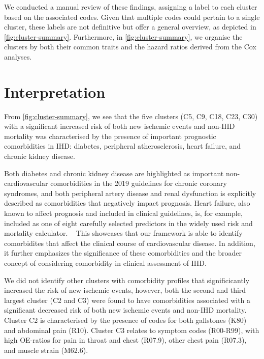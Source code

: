 We conducted a manual review of these findings, assigning a label to each
cluster based on the associated codes. Given that multiple codes could pertain
to a single cluster, these labels are not definitive but offer a general
overview, as depicted in \cref{fig:cluster-summary}. 
Furthermore, in \cref{fig:cluster-summary}, we organise the
clusters by both their common traits and the hazard ratios 
derived from the Cox analyses.

\section{Interpretation}

From \cref{fig:cluster-summary}, 
we see that the five clusters (C5, C9, C18, C23, C30) with a 
significant increased risk of both new ischemic events and non-\ac{IHD} mortality
was characterised by the presence of important prognostic comorbidities in \ac{IHD}:
diabetes, peripheral atherosclerosis, heart failure, 
and chronic kidney disease. 

Both diabetes and chronic kidney disease 
are highlighted as important non-cardiovascular
comorbidities in the 2019  guidelines for chronic coronary syndromes,
and both peripheral artery disease and renal dysfunction is explicitly
described as comorbidities that negatively impact prognosis.%
Heart failure, 
also known to affect prognosis and included in clinical guidelines,
is, for example, included as one of eight carefully selected predictors
in the widely used  risk and mortality calculator.
~\autocite{foxShould2014}
This showcases that our framework is able to identify comorbidites
that affect the clinical course of cardiovascular disease.
In addition, it further emphasizes the significance of these 
comorbidities and the broader concept of considering
comorbidity in clinical assessment of \ac{IHD}.

We did not identify other clusters with comorbidity profiles
that significicantly increased the risk of new ischemic events,
however, both the second and third largest cluster (C2 and C3)
were found to have comorbidities associated with a significant decreased risk
of both new ischemic events and non-\ac{IHD} mortality.
Cluster C2 is characterised by the presence of codes 
for both gallstones (K80) and abdominal pain (R10).
Cluster C3 relates to symptom codes (R00-R99),
with high \ac{OE}-ratios for
{pain in throat and chest} (R07.9), 
{other chest pain} (R07.3), 
and {muscle strain} (M62.6).


